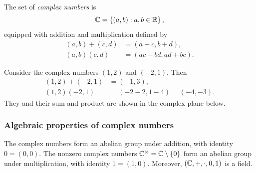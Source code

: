 \documentclass[11pt,a4paper]{amsart}
\begin{document}
\begin{definition}
  The set of \emph{complex numbers} is
  \[
    \mathbb{C}=\left\lbrace(a,b):a,b\in\mathbb{R}\right\rbrace,
  \]
  equipped with addition and multiplication defined by
  \begin{align*}
    (a,b)+(c,d)&=(a+c,b+d),\\
    (a,b)(c,d)&=(ac-bd,ad+bc).
  \end{align*}
\end{definition}

\begin{example}
  Consider the complex numbers \((1,2)\) and \((-2,1)\). Then
  \begin{align*}
    (1,2)+(-2,1)&=(-1,3),\\
    (1,2)(-2,1)&=(-2-2,1-4)=(-4,-3).
  \end{align*}
  They and their sum and product are shown in the complex plane below.
\end{example}

\begin{center}
\end{center}

\subsubsection{Algebraic properties of complex numbers}

\begin{theorem}
  The complex numbers form an abelian group under addition, with
  identity \(0=(0,0)\). The nonzero complex numbers
  \(\mathbb{C}^{\times}=\mathbb{C}\setminus\{0\}\) form an abelian group under
  multiplication, with identity \(1=(1,0)\). Moreover,
  \((\mathbb{C},+,\cdot,0,1)\) is a field.
\end{theorem}
\end{document}
